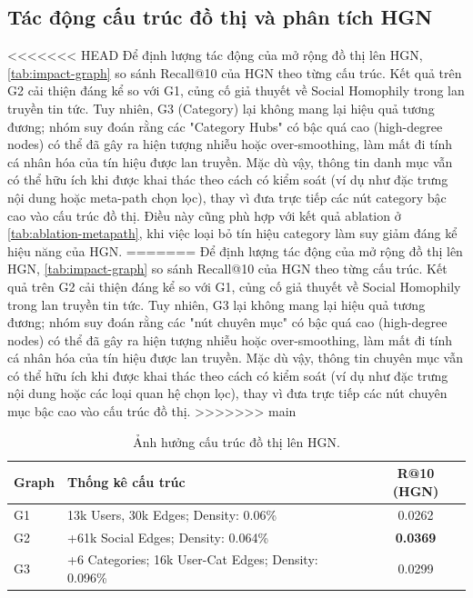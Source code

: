 \documentclass[11pt]{article}
\begin{document}
\subsection{Tác động cấu trúc đồ thị và phân tích HGN}
<<<<<<< HEAD
Để định lượng tác động của mở rộng đồ thị lên HGN, \autoref{tab:impact-graph} so sánh Recall@10 của HGN theo từng cấu trúc. Kết quả trên G2 cải thiện đáng kể so với G1, củng cố giả thuyết về Social Homophily trong lan truyền tin tức. Tuy nhiên, G3 (Category) lại không mang lại hiệu quả tương đương; nhóm suy đoán rằng các "Category Hubs" có bậc quá cao (high-degree nodes) có thể đã gây ra hiện tượng nhiễu hoặc over-smoothing, làm mất đi tính cá nhân hóa của tín hiệu được lan truyền. Mặc dù vậy, thông tin danh mục vẫn có thể hữu ích khi được khai thác theo cách có kiểm soát (ví dụ như đặc trưng nội dung hoặc meta-path chọn lọc), thay vì đưa trực tiếp các nút category bậc cao vào cấu trúc đồ thị. Điều này cũng phù hợp với kết quả ablation ở \autoref{tab:ablation-metapath}, khi việc loại bỏ tín hiệu category làm suy giảm đáng kể hiệu năng của HGN.
=======
Để định lượng tác động của mở rộng đồ thị lên HGN, \autoref{tab:impact-graph} so sánh Recall@10 của HGN theo từng cấu trúc. Kết quả trên G2 cải thiện đáng kể so với G1, củng cố giả thuyết về Social Homophily trong lan truyền tin tức. Tuy nhiên, G3 lại không mang lại hiệu quả tương đương; nhóm suy đoán rằng các "nút chuyên mục" có bậc quá cao (high-degree nodes) có thể đã gây ra hiện tượng nhiễu hoặc over-smoothing, làm mất đi tính cá nhân hóa của tín hiệu được lan truyền. Mặc dù vậy, thông tin chuyên mục vẫn có thể hữu ích khi được khai thác theo cách có kiểm soát (ví dụ như đặc trưng nội dung hoặc các loại quan hệ chọn lọc), thay vì đưa trực tiếp các nút chuyên mục bậc cao vào cấu trúc đồ thị.
>>>>>>> main


\begin{table}[!htbp]
    \centering
    \small
    \setlength{\tabcolsep}{3pt}
    \renewcommand{\arraystretch}{1.1}
    \begin{tabularx}{\linewidth}{l X c}
        \toprule
        \textbf{Graph} & \textbf{Thống kê cấu trúc}                          & \textbf{R@10 (HGN)} \\
        \midrule
        G1             & 13k Users, 30k Edges; Density: 0.06\%               & 0.0262              \\
        G2             & +61k Social Edges; Density: 0.064\%                 & \textbf{0.0369}     \\
        G3             & +6 Categories; 16k User-Cat Edges; Density: 0.096\% & 0.0299              \\
        \bottomrule
    \end{tabularx}
    \caption{Ảnh hưởng cấu trúc đồ thị lên HGN.}
    \label{tab:impact-graph}
\end{table}
\end{document}
